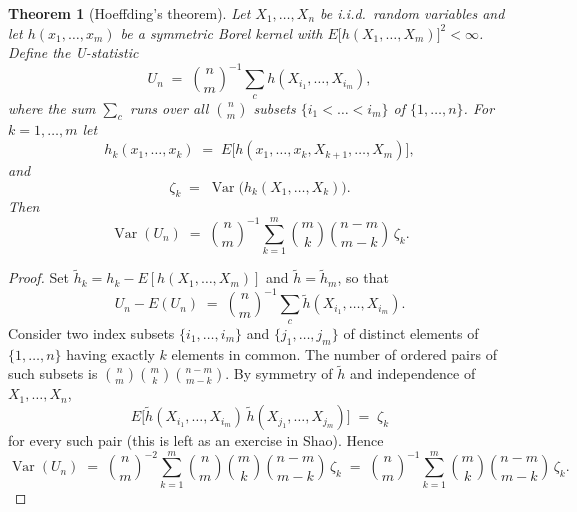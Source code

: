 \documentclass{article}
\newtheorem{theorem}{Theorem}
\DeclareMathOperator{\Var}{Var}
\begin{document}
\begin{theorem}[Hoeffding's theorem]
\label{thm:hoeffding-ustatistic-variance}
Let $X_1,\dots,X_n$ be i.i.d.\ random variables and let
$h(x_1,\dots,x_m)$ be a symmetric Borel kernel with
$E\bigl[h(X_1,\dots,X_m)\bigr]^2 < \infty$. Define the U-statistic
\[
  U_n \;=\; \binom{n}{m}^{-1} \sum_{c} h(X_{i_1},\dots,X_{i_m}),
\]
where the sum $\sum_c$ runs over all $\binom{n}{m}$ subsets
$\{i_1<\dots<i_m\}$ of $\{1,\dots,n\}$. For $k=1,\dots,m$ let
\[
  h_k(x_1,\dots,x_k) \;=\; E\bigl[h(x_1,\dots,x_k,X_{k+1},\dots,X_m)\bigr],
\]
and
\[
  \zeta_k \;=\; \Var\bigl(h_k(X_1,\dots,X_k)\bigr).
\]
Then
\[
  \Var(U_n) \;=\; \binom{n}{m}^{-1} \sum_{k=1}^{m} \binom{m}{k}\binom{n-m}{m-k}\,\zeta_k.
\]
\end{theorem}

\begin{proof}
Set $\tilde h_k = h_k - E[h(X_1,\dots,X_m)]$ and $\tilde h = \tilde h_m$,
so that
\[
  U_n - E(U_n) \;=\; \binom{n}{m}^{-1} \sum_{c} \tilde h(X_{i_1},\dots,X_{i_m}).
\]
Consider two index subsets $\{i_1,\dots,i_m\}$ and $\{j_1,\dots,j_m\}$
of distinct elements of $\{1,\dots,n\}$ having exactly $k$ elements in
common. The number of ordered pairs of such subsets is
$\binom{n}{m}\binom{m}{k}\binom{n-m}{m-k}$. By symmetry of $\tilde h$
and independence of $X_1,\dots,X_n$,
\[
  E\bigl[\tilde h(X_{i_1},\dots,X_{i_m})\,\tilde h(X_{j_1},\dots,X_{j_m})\bigr] \;=\; \zeta_k
\]
for every such pair (this is left as an exercise in Shao). Hence
\[
  \Var(U_n) \;=\; \binom{n}{m}^{-2} \sum_{k=1}^{m} \binom{n}{m}\binom{m}{k}\binom{n-m}{m-k}\,\zeta_k
            \;=\; \binom{n}{m}^{-1} \sum_{k=1}^{m} \binom{m}{k}\binom{n-m}{m-k}\,\zeta_k.
\]
\end{proof}
\end{document}
